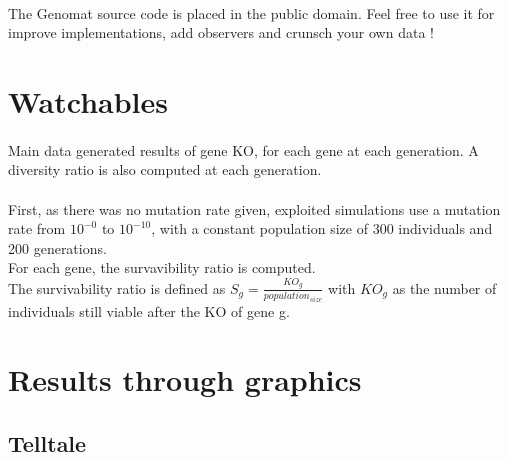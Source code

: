 \documentclass[]{report} %
\begin{document}
        \paragraph*{}
        The Genomat source code is placed in the public domain. Feel free to use it for improve implementations, add observers and crunsch your own data ! 



\section{Watchables}
    \paragraph*{}
    Main data generated results of gene KO, for each gene at each generation. 
    A diversity ratio is also computed at each generation.
    \paragraph*{}
     First, as there was no mutation rate given, exploited simulations use a mutation rate from $10^{-0}$ to $10^{-10}$, 
     with a constant population size of 300 individuals and 200 generations.\\
     For each gene, the survavibility ratio is computed. \\
     The survivability ratio is defined as $S_g = \frac{KO_g}{population_{size}}$ 
     with $KO_g$ as the number of individuals still viable after the KO of gene g.



\newpage
\section*{Results through graphics}
\subsection{Telltale}
\end{document}
